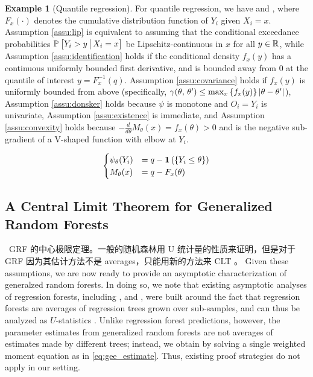 \documentclass[aos]{imsart}
\theoremstyle{plain}
\theoremstyle{definition}
\newtheorem{exam}{Example}
\theoremstyle{remark}
\begin{document}
\begin{CJK}{UTF8}{gbsn}
\begin{exam}[Quantile regression]
For quantile regression, we have
and ,
where $F_x(\cdot)$ denotes the cumulative distribution function of $Y_i$ given $X_i = x$.
Assumption \ref{assu:lip} is equivalent to assuming that the
conditional exceedance probabilities $\mathbb{P}_{}\left[Y_i > y \,\big|\, X_i = x\right]$
be Lipschitz-continuous in $x$ for all $y \in \mathbb{R}$, while Assumption \ref{assu:identification}
holds if the conditional density $f_x(y)$ has a continuous uniformly bounded first derivative,
and is bounded away from 0 at the quantile of interest $y = F^{-1}_x(q)$.
Assumption \ref{assu:covariance} holds if $f_x(y)$ is uniformly bounded from above
(specifically, $\gamma(\theta, \, \theta') \leq \max_x \left\{f_x(y)\right\} \left\lvert\theta - \theta'\right\rvert$),
Assumption \ref{assu:donsker} holds because $\psi$ is monotone and $O_i = Y_i$ is univariate,
Assumption \ref{assu:existence} is immediate, and Assumption \ref{assu:convexity} holds
because $ - \frac{d}{d\theta} M_\theta(x) = f_x(\theta) > 0$ and 
is the negative sub-gradient of a V-shaped function with elbow at $Y_i$.
\end{exam}


\begin{equation*}
\begin{cases}
\psi_{\theta}(Y_i) &= q - \1\p{\cb{Y_i \leq \theta}} \\
M_{\theta}(x) &= q - F_{x}(\theta)
\end{cases}
\end{equation*}

\subsection{A Central Limit Theorem for Generalized Random Forests}
\label{sec:gauss}

\, GRF 的中心极限定理。一般的随机森林用 U 统计量的性质来证明，但是对于 GRF 因为其估计方法不是 averages，只能用新的方法来 CLT 。 Given these assumptions, we are now ready to provide an asymptotic characterization
of generalzed random forests. In doing so, we note that existing asymptotic analyses of regression forests,
including \citet{mentch2016quantifying}, \citet{scornet2015consistency} and \citet{wager2015estimation},
were built around the fact that regression forests are averages of regression
trees grown over sub-samples, and can thus be analyzed as $U$-statistics \citep{hoeffding1948class}. Unlike regression forest predictions, however, the parameter estimates  from generalized random forests are not averages of estimates made by different trees;
instead, we obtain  by solving a single weighted moment equation as in \eqref{eq:gee_estimate}. Thus, existing proof strategies do not apply in our setting.


\end{CJK}
\end{document}

